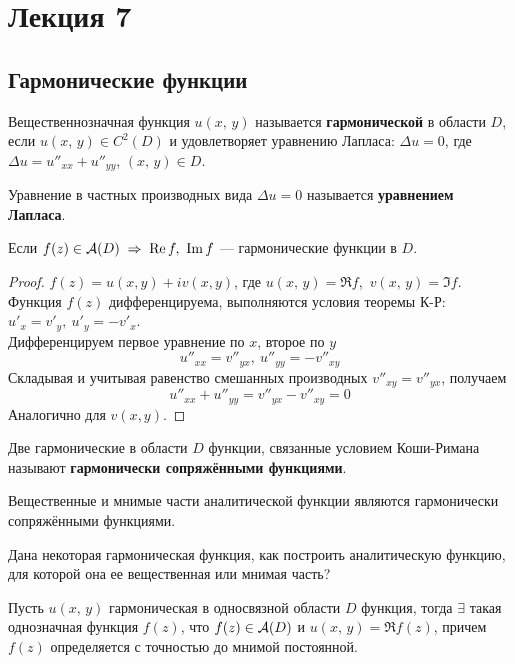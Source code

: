 	\section{Лекция 7}
	\subsection{Гармонические функции}
	\begin{definition}
		Вещественнозначная функция $u(x,\,y)$ называется \textbf{гармонической} в области $D$, если $u(x,\,y) \in C^2(D)$ и удовлетворяет уравнению Лапласа: $\Delta u = 0$, где $\Delta u = u''_{xx} + u''_{yy}$, $(x,\,y) \in D$.
	\end{definition}
	\begin{remark}
		Уравнение в частных производных вида $\Delta u = 0$ называется \textbf{уравнением Лапласа}.
	\end{remark}
	\begin{theorem}
		Если $f(z) \in \mathcal{A}(D) \;\Rightarrow\; \operatorname{Re} f,\ \operatorname{Im} f$ --- гармонические функции в $D$.
	\end{theorem}
	\begin{proof}
		$f(z) = u(x,y) + i v(x,y)$, где $u(x,\,y) = \Re f$,\ $v(x,\,y) = \Im f$.\\
		Функция $ f(z) $ дифференцируема, выполняются условия теоремы К-Р: $u'_x = v'_y,\ u'_y = -v'_x$.\\
		Дифференцируем первое уравнение по $x$, второе по $y$
		\[ u''_{xx} = v''_{yx}, \ u''_{yy} = -v''_{xy} \]
		Складывая и учитывая равенство смешанных производных $v''_{xy} = v''_{yx}$, получаем
		\[ u''_{xx} + u''_{yy} = v''_{yx} - v''_{xy} = 0 \]
		Аналогично для $v(x,y)$.
	\end{proof}
	\begin{definition}
		Две гармонические в области $D$ функции, связанные условием Коши-Римана называют \textbf{гармонически сопряжёнными функциями}.
	\end{definition}
	\begin{remark}
		Вещественные и мнимые части аналитической функции являются гармонически сопряжёнными функциями.
	\end{remark}
	Дана некоторая гармоническая функция, как построить аналитическую функцию, для которой она ее вещественная или мнимая часть?
	\begin{theorem}
		Пусть $u(x,\,y)$ гармоническая в односвязной области $D$ функция, тогда $\exists$ такая однозначная функция $f(z)$, что $f(z) \in \mathcal{A}(D)$ и $u(x,\,y) = \Re f(z)$, причем $f(z)$ определяется с точностью до мнимой постоянной.
	\end{theorem}
